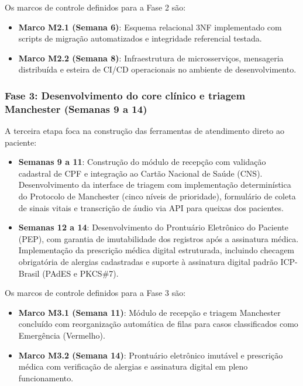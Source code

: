 Os marcos de controle definidos para a Fase 2 são:
\begin{itemize}[leftmargin=*]
    \item \textbf{Marco M2.1 (Semana 6)}: Esquema relacional 3NF implementado com scripts de migração automatizados e integridade referencial testada.
    \item \textbf{Marco M2.2 (Semana 8)}: Infraestrutura de microsserviços, mensageria distribuída e esteira de CI/CD operacionais no ambiente de desenvolvimento.
\end{itemize}

\subsubsection{Fase 3: Desenvolvimento do core clínico e triagem Manchester (Semanas 9 a 14)}

A terceira etapa foca na construção das ferramentas de atendimento direto ao paciente:
\begin{itemize}[leftmargin=*]
    \item \textbf{Semanas 9 a 11}: Construção do módulo de recepção com validação cadastral de CPF e integração ao Cartão Nacional de Saúde (CNS). Desenvolvimento da interface de triagem com implementação determinística do Protocolo de Manchester (cinco níveis de prioridade), formulário de coleta de sinais vitais e transcrição de áudio via API para queixas dos pacientes.
    \item \textbf{Semanas 12 a 14}: Desenvolvimento do Prontuário Eletrônico do Paciente (PEP), com garantia de imutabilidade dos registros após a assinatura médica. Implementação da prescrição médica digital estruturada, incluindo checagem obrigatória de alergias cadastradas e suporte à assinatura digital padrão ICP-Brasil (PAdES e PKCS\#7).
\end{itemize}

Os marcos de controle definidos para a Fase 3 são:
\begin{itemize}[leftmargin=*]
    \item \textbf{Marco M3.1 (Semana 11)}: Módulo de recepção e triagem Manchester concluído com reorganização automática de filas para casos classificados como Emergência (Vermelho).
    \item \textbf{Marco M3.2 (Semana 14)}: Prontuário eletrônico imutável e prescrição médica com verificação de alergias e assinatura digital em pleno funcionamento.
\end{itemize}

